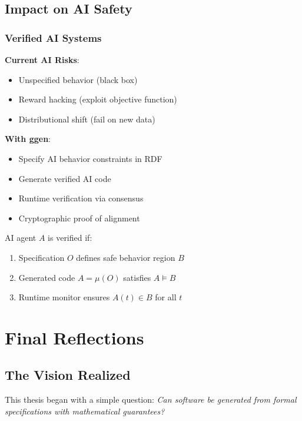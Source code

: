 \subsection{Impact on AI Safety}

\subsubsection{Verified AI Systems}

\textbf{Current AI Risks}:
\begin{itemize}
    \item Unspecified behavior (black box)
    \item Reward hacking (exploit objective function)
    \item Distributional shift (fail on new data)
\end{itemize}

\textbf{With ggen}:
\begin{itemize}
    \item Specify AI behavior constraints in RDF
    \item Generate verified AI code
    \item Runtime verification via consensus
    \item Cryptographic proof of alignment
\end{itemize}

\begin{definition}
    AI agent $A$ is verified if:
    \begin{enumerate}
        \item Specification $O$ defines safe behavior region $B$
        \item Generated code $A = \mu(O)$ satisfies $A \models B$
        \item Runtime monitor ensures $A(t) \in B$ for all $t$
    \end{enumerate}
\end{definition}

\section{Final Reflections}

\subsection{The Vision Realized}

This thesis began with a simple question: \textit{Can software be generated from formal specifications with mathematical guarantees?}

